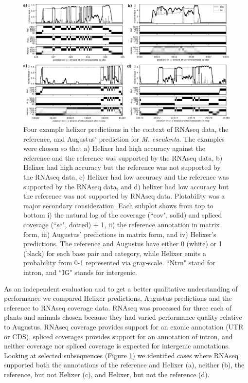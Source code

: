 \documentclass{bioinfo}
\begin{document}
\begin{figure}[!h]
\label{fig:cov_example_main}
\centerline{\includegraphics[width=\textwidth]{images/cov_examples/cov_example_main}}
\caption{Four example helixer predictions in the context of RNAseq data, the reference,
and Augustus' prediction for {\it M. esculenta}. The examples were chosen so
that a) Helixer had high accuracy against the reference and the reference
was supported by the RNAseq data, b) Helixer had high accuracy but the 
reference was not supported by the RNAseq data, c) Helixer had low accuracy
and the reference was supported by the RNAseq data, and d) helixer had low
accuracy but the reference was not supported by RNAseq data. Plotability was
a major secondary consideration. Each subplot shows from top to
bottom i) the natural log of the coverage (``cov", solid) and spliced coverage 
(``sc", dotted) + 1, ii) the reference annotation in matrix form, iii) 
Augustus' predictions in matrix form, and iv) Helixer's predictions. The reference
and Augustus have either 0 (white) or 1 (black) for each base pair and category, while
Helixer emits a probability from 0-1 represented via gray-scale. ``Ntrn" stand
for intron, and ``IG" stands for intergenic.
}
\end{figure}

As an independent evaluation and to get a better qualitative understanding of
performance we compared Helixer predictions, Augustus predictions and the
reference to RNAseq coverage data. RNAseq was processed for three each of plants
and animals chosen because they had varied performance quality relative to Augustus. 
RNAseq coverage provides support for an 
exonic annotation (UTR or CDS), spliced coverages provides support for an 
annotation of intron, and neither coverage nor spliced coverage is expected 
for intergenic annotations. Looking at selected subsequences (Figure \ref{fig:cov_example_main}) %
we identified cases where RNAseq supported both the annotations of the reference 
and Helixer (a), neither (b), the reference, but not Helixer (c),
and Helixer, but not the reference (d). 
\end{document}
